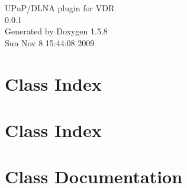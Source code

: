 \documentclass[a4paper]{book}
\begin{document}
\begin{titlepage}
\vspace*{7cm}
\begin{center}
{\Large UPnP/DLNA plugin for VDR \\[1ex]\large 0.0.1 }\\
\vspace*{1cm}
{\large Generated by Doxygen 1.5.8}\\
\vspace*{0.5cm}
{\small Sun Nov 8 15:44:08 2009}\\
\end{center}
\end{titlepage}
\clearemptydoublepage
{}
\tableofcontents
\clearemptydoublepage
{}
\chapter{Class Index}

\chapter{Class Index}

\chapter{Class Documentation}














































\printindex
\end{document}
